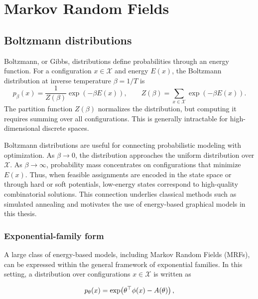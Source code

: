 \section{Markov Random Fields}
\label{sec:mrf_intro}

\subsection{Boltzmann distributions}

Boltzmann, or Gibbs, distributions define probabilities through an energy function. For a configuration $x \in \mathcal{X}$ and energy $E(x)$, the Boltzmann distribution at inverse temperature $\beta = 1/T$ is
\begin{equation}
    \label{equ:boltzmann_distribution}
    p_\beta(x) = \frac{1}{Z(\beta)} \exp\!\left(-\beta E(x)\right), \qquad 
    Z(\beta) = \sum_{x\in\mathcal{X}} \exp\!\left(-\beta E(x)\right).
\end{equation}
The partition function $Z(\beta)$ normalizes the distribution, but computing it requires summing over all configurations. This is generally intractable for high-dimensional discrete spaces.

Boltzmann distributions are useful for connecting probabilistic modeling with optimization. As $\beta \to 0$, the distribution approaches the uniform distribution over $\mathcal{X}$. As $\beta \to \infty$, probability mass concentrates on configurations that minimize $E(x)$. Thus, when feasible assignments are encoded in the state space or through hard or soft potentials, low-energy states correspond to high-quality combinatorial solutions. This connection underlies classical methods such as simulated annealing \citep{kirkpatrick_optimization_1983} and motivates the use of energy-based graphical models in this thesis.

\subsubsection{Exponential-family form}
A large class of energy-based models, including Markov Random Fields (MRFs), can be expressed within the general framework of exponential families. In this setting, a distribution over configurations $x \in \mathcal{X}$ is written as

\begin{equation}
p_\theta(x) = \exp\!\left(\theta^\top \phi(x) - A(\theta)\right),
\end{equation}

